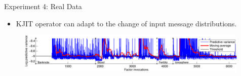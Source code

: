 \documentclass[english]{beamer}
\begin{document}
\begin{frame}
\begin{columns}[t]
\begin{block}{ Experiment 4: Real Data}
\begin{itemize}
    \item KJIT operator can adapt to the change of input message distributions.
\end{itemize}

\begin{figure}
\centering
\includegraphics[width=0.99\textwidth]{online/uci_temporal_uncertainty-crop}
\end{figure}

\end{block}










\end{columns}

\end{frame}
\end{document}

